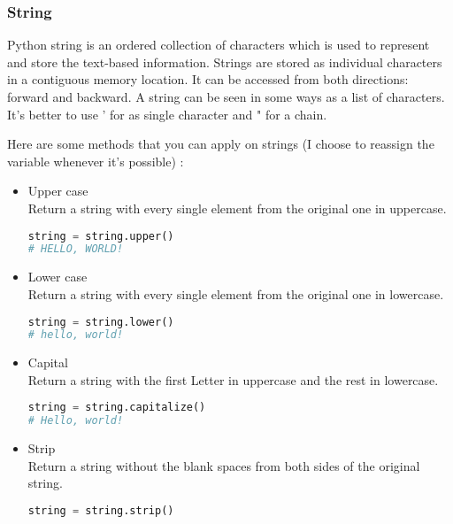 \documentclass[a4paper, 12pt, titlepage]{scrartcl} %
\begin{document}
\subsubsection{String}
Python string is an ordered collection of characters which is used to represent and store the text-based information. Strings are stored as individual characters in a contiguous memory location. It can be accessed from both directions: forward and backward. A string can be seen in some ways as a list of characters. \\It's better to use ' for as single character and " for a chain.

\vspace{5mm}

Here are some methods that you can apply on strings (I choose to reassign the variable whenever it's possible) : 
\begin{itemize}
\begin{lstlisting}[language=Python]
string = "Hello, world!"
\end{lstlisting} \vspace{5mm}

\item Upper case \\
Return a string with every single element from the original one in uppercase.
\begin{lstlisting}[language=Python]
string = string.upper()
# HELLO, WORLD!
\end{lstlisting} \vspace{5mm}

\item Lower case \\
Return a string with every single element from the original one in lowercase.
\begin{lstlisting}[language=Python]
string = string.lower()
# hello, world!
\end{lstlisting} \vspace{5mm}

\item Capital \\
Return a string with the first Letter in uppercase and the rest in lowercase.
\begin{lstlisting}[language=Python]
string = string.capitalize()
# Hello, world!
\end{lstlisting} \vspace{5mm}

\item Strip \\
Return a string without the blank spaces from both sides of the original string.
\begin{lstlisting}[language=Python]
string = string.strip()
\end{lstlisting} \vspace{5mm}


\end{itemize}
\end{document}
